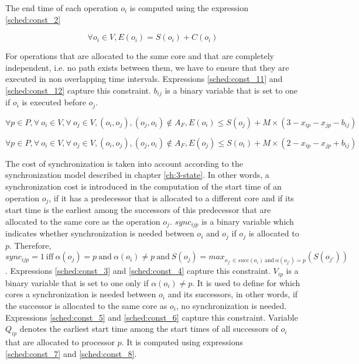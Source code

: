 The end time of each operation $o_i$ is computed using the expression \ref{sched:const_2}

\begin{equation}
\forall o_i \in V, E(o_i) = S(o_i) + C(o_i)
\label{sched:const_2}
\end{equation}

For operations that are allocated to the same core and that are completely independent, i.e. no path exists between them, we have to ensure that they are executed in non overlapping time intervals. Expressions \ref{sched:const_11} and \ref{sched:const_12} capture this constraint. $b_{ij}$ is a binary variable that is set to one if $o_i$ is executed before $o_j$.

\begin{equation}
\forall p \in P, \forall\ o_i \in V, \forall\ o_j \in V, (o_i,o_j), (o_j,o_i) \notin A_F, E(o_i) \leq S(o_j) + M \times (3 - x_{ip} - x_{jp} - b_{ij}) 
\label{sched:const_11}
\end{equation}

\begin{equation}
\forall p \in P, \forall\ o_i \in V, \forall\ o_j \in V, (o_i,o_j), (o_j,o_i) \notin A_F, E(o_j) \leq S(o_i) + M \times (2 - x_{ip} - x_{jp} + b_{ij}) 
\label{sched:const_12}
\end{equation}

The cost of synchronization is taken into account according to the synchronization model described in chapter \ref{ch:3-state}. In other words, a synchronization cost is introduced in the computation of the start time of an operation $o_j$, if it has a predecessor that is allocated to a different core and if its start time is the earliest among the successors of this predecessor that are allocated to the same core as the operation $o_j$. $sync_{ijp}$ is a binary variable which indicates whether synchronization is needed between $o_i$ and $o_j$ if $o_j$ is allocated to $p$. Therefore, $sync_{ijp} = 1\ \text{iff}\ \alpha(o_j)=p\ \text{and}\ \alpha(o_i)\neq p\  \text{and}\ S(o_j) = max_{o_{j'} \in succ(o_i)\ \text{and}\ \alpha(o_{j'}) = p}(S(o_{j'}))$. Expressions \ref{sched:const_3} and \ref{sched:const_4} capture this constraint. $V_{ip}$ is a binary variable that is set to one only if $\alpha(o_i) \neq p$. It is used to define for which cores a synchronization is needed between $o_i$ and its successors, in other words, if the successor is allocated to the same core as $o_i$, no synchronization is needed. Expressions \ref{sched:const_5} and \ref{sched:const_6} capture this constraint. Variable $Q_{ip}$ denotes the earliest start time among the start times of all successors of $o_i$ that are allocated to processor $p$. It is computed using expressions \ref{sched:const_7} and \ref{sched:const_8}. 


